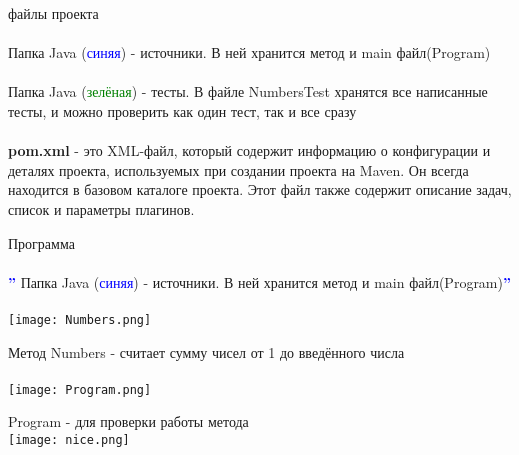 \documentclass{article}
\begin{document}
    \large{файлы проекта}
\\ \\
\large{Папка Java (\textcolor{blue}{синяя}) - источники. В ней хранится метод и main файл(Program) }
\\ \\
\large{Папка Java (\textcolor{green}{зелёная}) - тесты. В файле NumbersTest хранятся все написанные тесты, и можно проверить как один тест, так и все сразу}
\\ \\
\large{\textbf{pom.xml} - это XML-файл, который содержит информацию о конфигурации и деталях проекта, используемых при создании проекта на Maven. Он всегда находится в базовом каталоге проекта. Этот файл также содержит описание задач, список и параметры плагинов.}

\newpage
\huge{Программа} \\ \\
\large{\textcolor{blue}{\textbf{''}} Папка Java (\textcolor{blue}{синяя}) - источники. В ней хранится метод и main файл(Program)\textcolor{blue}{\textbf{''}}}
\\ \\
\texttt{[image: Numbers.png]}

Метод Numbers - считает сумму чисел от 1 до введённого числа
\\ \\
\texttt{[image: Program.png]}

Program - для проверки работы метода
\\
\texttt{[image: nice.png]}
\end{document}
